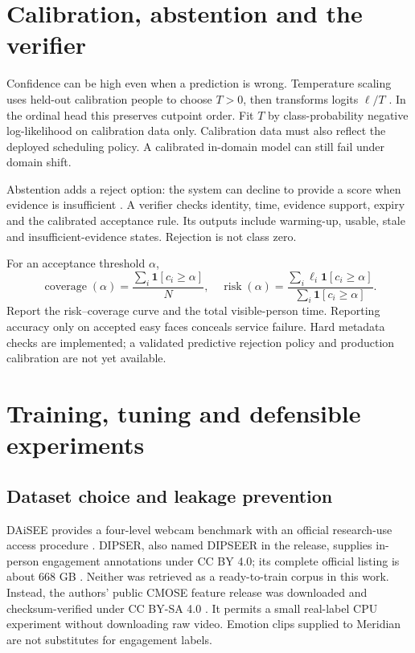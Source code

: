 \documentclass[10pt,a4paper]{article}
\newcommand{\ind}{\mathbf{1}}
\begin{document}
\section{Calibration, abstention and the verifier}
Confidence can be high even when a prediction is wrong. Temperature scaling uses held-out calibration people to choose $T>0$, then transforms logits $\ell/T$ \cite{guo}. In the ordinal head this preserves cutpoint order. Fit $T$ by class-probability negative log-likelihood on calibration data only. Calibration data must also reflect the deployed scheduling policy. A calibrated in-domain model can still fail under domain shift.

Abstention adds a reject option: the system can decline to provide a score when evidence is insufficient \cite{selective}. A verifier checks identity, time, evidence support, expiry and the calibrated acceptance rule. Its outputs include warming-up, usable, stale and insufficient-evidence states. Rejection is not class zero.

For an acceptance threshold $\alpha$,
\begin{equation}
\operatorname{coverage}(\alpha)=\frac{\sum_i\ind[c_i\geq\alpha]}N,\quad
\operatorname{risk}(\alpha)=\frac{\sum_i\ell_i\ind[c_i\geq\alpha]}{\sum_i\ind[c_i\geq\alpha]}.
\end{equation}
Report the risk--coverage curve and the total visible-person time. Reporting accuracy only on accepted easy faces conceals service failure. Hard metadata checks are implemented; a validated predictive rejection policy and production calibration are not yet available.

\section{Training, tuning and defensible experiments}
\subsection{Dataset choice and leakage prevention}
DAiSEE provides a four-level webcam benchmark with an official research-use access procedure \cite{daisee}. DIPSER, also named DIPSEER in the release, supplies in-person engagement annotations under CC BY 4.0; its complete official listing is about 668 GB \cite{dipser}. Neither was retrieved as a ready-to-train corpus in this work. Instead, the authors' public CMOSE feature release was downloaded and checksum-verified under CC BY-SA 4.0 \cite{cmose}. It permits a small real-label CPU experiment without downloading raw video. Emotion clips supplied to Meridian are not substitutes for engagement labels.
\end{document}
